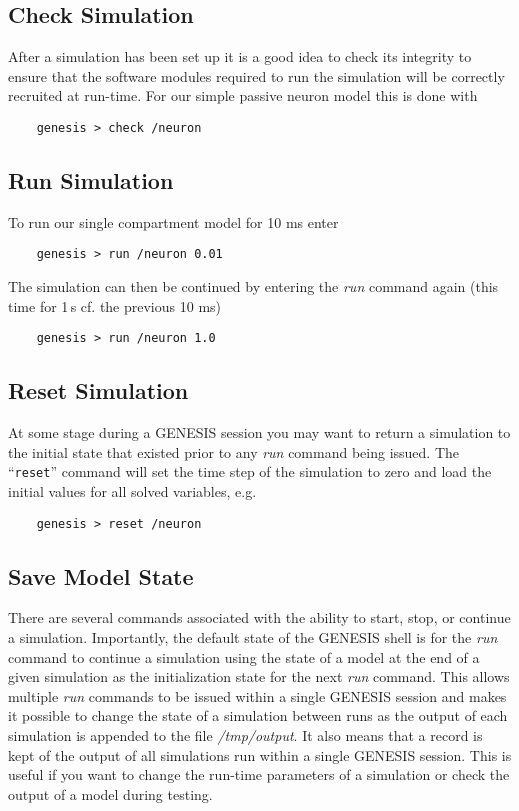 \documentclass[12pt]{article}
\begin{document}
\subsection*{Check Simulation}

After a simulation has been set up it is a good idea to check its integrity to ensure that the software modules required to run the simulation will be correctly recruited at run-time. For our simple passive neuron model this is done with 
\begin{verbatim}
    genesis > check /neuron
\end{verbatim}

\subsection*{Run Simulation}

To run our single compartment model for 10 ms enter
\begin{verbatim}
    genesis > run /neuron 0.01
\end{verbatim}
The simulation can then be continued by entering the {\it run} command again (this time for 1\,s cf. the previous 10 ms)
\begin{verbatim}
    genesis > run /neuron 1.0
\end{verbatim}

\subsection*{Reset Simulation}

At some stage during a GENESIS session you may want to return a simulation to the initial state that existed prior to any {\it run} command being issued. The ``{\tt reset}'' command will set the time step of the simulation to zero and load the initial values for all solved variables, e.g.
\begin{verbatim}
    genesis > reset /neuron
\end{verbatim}

\subsection*{Save Model State}

There are several commands associated with the ability to start, stop, or continue a simulation. Importantly, the default state of the GENESIS shell is for the {\it run} command to continue a simulation using the state of a model at the end of a given simulation as the initialization state for the next {\it run} command. This allows multiple {\it run} commands to be issued within a single GENESIS session and makes it possible to change the state of a simulation between runs as the output of each simulation is appended to the file {\it /tmp/output}. It also means that a record is kept of the output of all simulations run within a single GENESIS session. This is useful if you want to change the run-time parameters of a simulation or check the output of a model during testing.
\end{document}
